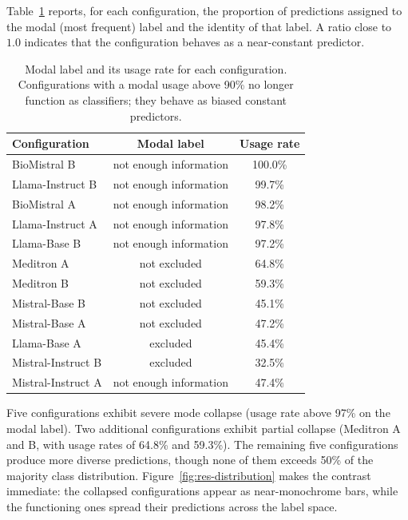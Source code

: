 Table~\ref{tab:res-collapse-dist} reports, for each configuration, the 
proportion of predictions assigned to the modal (most frequent) label and 
the identity of that label. A ratio close to $1.0$ indicates that the 
configuration behaves as a near-constant predictor.

\begin{table}[htbp]
    \centering
    \caption{Modal label and its usage rate for each configuration. 
        Configurations with a modal usage above 90\% no longer function 
        as classifiers; they behave as biased constant predictors.}
    \label{tab:res-collapse-dist}
    \small
    \begin{tabular}{@{}lcc@{}}
        \toprule
        \textbf{Configuration} & 
        \textbf{Modal label} & 
        \textbf{Usage rate} \\
        \midrule
        BioMistral B       & not enough information & 100.0\% \\
        Llama-Instruct B   & not enough information & \phantom{0}99.7\% \\
        BioMistral A       & not enough information & \phantom{0}98.2\% \\
        Llama-Instruct A   & not enough information & \phantom{0}97.8\% \\
        Llama-Base B       & not enough information & \phantom{0}97.2\% \\
        \midrule
        Meditron A         & not excluded           & \phantom{0}64.8\% \\
        Meditron B         & not excluded           & \phantom{0}59.3\% \\
        \midrule
        Mistral-Base B     & not excluded           & \phantom{0}45.1\% \\
        Mistral-Base A     & not excluded           & \phantom{0}47.2\% \\
        Llama-Base A       & excluded               & \phantom{0}45.4\% \\
        Mistral-Instruct B & excluded               & \phantom{0}32.5\% \\
        Mistral-Instruct A & not enough information & \phantom{0}47.4\% \\
        \bottomrule
    \end{tabular}
\end{table}

Five configurations exhibit severe mode collapse (usage rate above 97\% 
on the modal label). Two additional configurations exhibit partial 
collapse (Meditron A and B, with usage rates of 64.8\% and 59.3\%). The 
remaining five configurations produce more diverse predictions, though 
none of them exceeds 50\% of the majority class distribution. 
Figure~\ref{fig:res-distribution} makes the contrast immediate: the 
collapsed configurations appear as near-monochrome bars, while the 
functioning ones spread their predictions across the label space.

